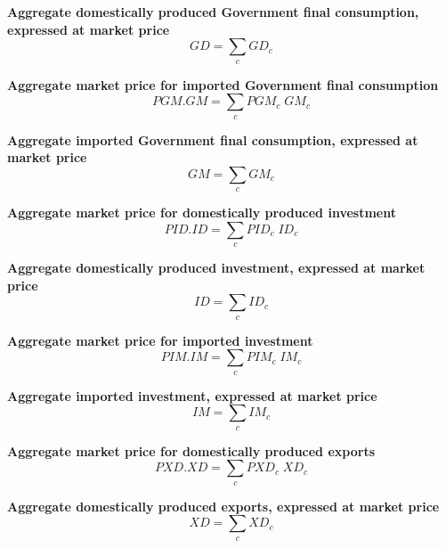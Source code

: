 \documentclass[12pt]{article}
\numberwithin{equation}{section}
\begin{document}
\noindent\textbf{Aggregate domestically produced Government final consumption, expressed at market price} \\
\begin{dmath}
GD = \sum_{c} GD_{c}
\end{dmath}

\noindent\textbf{Aggregate market price for imported Government final consumption} \\
\begin{dmath}
PGM . GM = \sum_{c} PGM_{c} \; GM_{c}
\end{dmath}

\noindent\textbf{Aggregate imported Government final consumption, expressed at market price} \\
\begin{dmath}
GM = \sum_{c} GM_{c}
\end{dmath}

\noindent\textbf{Aggregate market price for domestically produced investment} \\
\begin{dmath}
PID . ID = \sum_{c} PID_{c} \; ID_{c}
\end{dmath}

\noindent\textbf{Aggregate domestically produced investment, expressed at market price} \\
\begin{dmath}
ID = \sum_{c} ID_{c}
\end{dmath}

\noindent\textbf{Aggregate market price for imported investment} \\
\begin{dmath}
PIM . IM = \sum_{c} PIM_{c} \; IM_{c}
\end{dmath}

\noindent\textbf{Aggregate imported investment, expressed at market price} \\
\begin{dmath}
IM = \sum_{c} IM_{c}
\end{dmath}

\noindent\textbf{Aggregate market price for domestically produced exports} \\
\begin{dmath}
PXD . XD = \sum_{c} PXD_{c} \; XD_{c}
\end{dmath}

\noindent\textbf{Aggregate domestically produced exports, expressed at market price} \\
\begin{dmath}
XD = \sum_{c} XD_{c}
\end{dmath}
\end{document}
